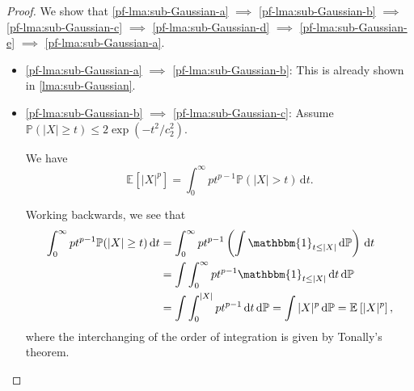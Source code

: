 \begin{proof}
	We show that \autoref{pf-lma:sub-Gaussian-a} \(\implies \) \autoref{pf-lma:sub-Gaussian-b} \(\implies \) \autoref{pf-lma:sub-Gaussian-c} \(\implies \) \autoref{pf-lma:sub-Gaussian-d} \(\implies \) \autoref{pf-lma:sub-Gaussian-e} \(\implies \) \autoref{pf-lma:sub-Gaussian-a}.
	\begin{itemize}
		\item \autoref{pf-lma:sub-Gaussian-a} \(\implies \) \autoref{pf-lma:sub-Gaussian-b}: This is already shown in \autoref{lma:sub-Gaussian}.
		\item \autoref{pf-lma:sub-Gaussian-b} \(\implies \) \autoref{pf-lma:sub-Gaussian-c}: Assume \(\mathbb{P} (\vert X \vert \geq t) \leq 2 \exp (-t^2 / c_2^2)\).

		      \begin{claim}
			      We have
			      \[
				      \mathbb{E}_{}\left[\vert X \vert ^p \right] = \int_{0}^{\infty} p t^{p-1} \mathbb{P} (\vert X \vert > t) \,\mathrm{d}t.
			      \]
		      \end{claim}
		      \begin{explanation}
			      Working backwards, we see that
			      \[
				      \begin{split}
					      \int_{0}^{\infty} p t^{p-1} \mathbb{P} (\vert X \vert \geq t) \,\mathrm{d}t
					      &= \int_{0}^{\infty} p t^{p-1} \left( \int \mathbbm{1}_{t \leq \vert X \vert } \,\mathrm{d} \mathbb{P} \right)  \,\mathrm{d}t \\
					      &= \int \int_{0}^{\infty} p t^{p-1} \mathbbm{1}_{t \leq \vert X \vert } \,\mathrm{d}t \,\mathrm{d} \mathbb{P} \\
					      &= \int \int_{0}^{\vert X \vert } p t^{p-1} \,\mathrm{d}t \,\mathrm{d} \mathbb{P}
					      = \int \vert X \vert ^p \,\mathrm{d} \mathbb{P}
					      = \mathbb{E}_{}\left[\vert X \vert ^p \right],
				      \end{split}
			      \]
			      where the interchanging of the order of integration is given by Tonally's theorem.
		      \end{explanation}


\end{itemize}
\end{proof}
